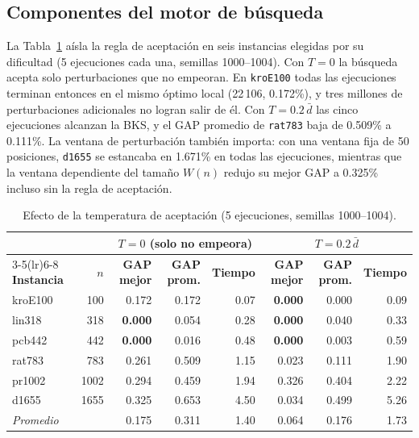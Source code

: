 \documentclass[runningheads]{llncs}
\begin{document}
\subsection{Componentes del motor de búsqueda}
\label{sec:engine-ablation}

La Tabla~\ref{tab:ablation} aísla la regla de aceptación en seis
instancias elegidas por su dificultad (5 ejecuciones cada una, semillas
1000--1004). Con $T=0$ la búsqueda acepta solo perturbaciones que no
empeoran. En \texttt{kroE100} todas las ejecuciones terminan entonces en
el mismo óptimo local (22\,106, 0.172\%), y tres millones de
perturbaciones adicionales no logran salir de él. Con $T=0.2\,\bar d$
las cinco ejecuciones alcanzan la BKS, y el GAP promedio de
\texttt{rat783} baja de 0.509\% a 0.111\%. La ventana de perturbación
también importa: con una ventana fija de 50 posiciones, \texttt{d1655}
se estancaba en 1.671\% en todas las ejecuciones, mientras que la
ventana dependiente del tamaño $W(n)$ redujo su mejor GAP a 0.325\%
incluso sin la regla de aceptación.

\begin{table}
\caption{Efecto de la temperatura de aceptación (5 ejecuciones, semillas
1000--1004).}
\label{tab:ablation}
\centering\scriptsize
\begin{tabular}{@{}lrrrrrrr@{}}
\toprule
& & \multicolumn{3}{c}{$T=0$ (solo no empeora)} & \multicolumn{3}{c}{$T=0.2\,\bar d$} \\
\cmidrule(lr){3-5}\cmidrule(lr){6-8}
\textbf{Instancia} & $n$ & \textbf{GAP mejor} & \textbf{GAP prom.} & \textbf{Tiempo} & \textbf{GAP mejor} & \textbf{GAP prom.} & \textbf{Tiempo} \\
\midrule
kroE100 &  100 & 0.172 & 0.172 & 0.07 & \textbf{0.000} & 0.000 & 0.09 \\
lin318  &  318 & \textbf{0.000} & 0.054 & 0.28 & \textbf{0.000} & 0.040 & 0.33 \\
pcb442  &  442 & \textbf{0.000} & 0.016 & 0.48 & \textbf{0.000} & 0.003 & 0.59 \\
rat783  &  783 & 0.261 & 0.509 & 1.15 & 0.023 & 0.111 & 1.90 \\
pr1002  & 1002 & 0.294 & 0.459 & 1.94 & 0.326 & 0.404 & 2.22 \\
d1655   & 1655 & 0.325 & 0.653 & 4.50 & 0.034 & 0.499 & 5.26 \\
\midrule
\textit{Promedio} & & 0.175 & 0.311 & 1.40 & 0.064 & 0.176 & 1.73 \\
\bottomrule
\end{tabular}
\end{table}
\end{document}
